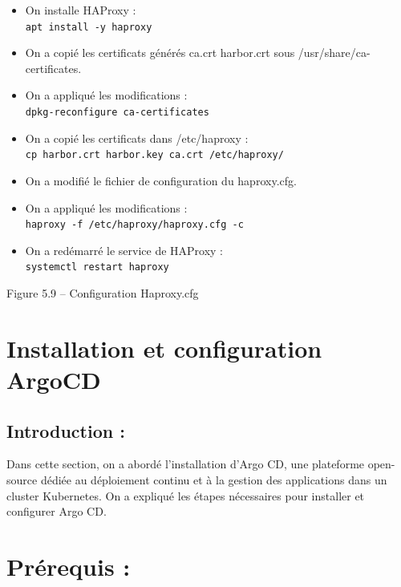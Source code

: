 \begin{itemize}

\item On installe HAProxy : \\
\texttt{apt install -y haproxy}

\item On a copié les certificats générés ca.crt harbor.crt sous /usr/share/ca-certificates.

\item On a appliqué les modifications : \\
\texttt{dpkg-reconfigure ca-certificates}

\item On a copié les certificats dans /etc/haproxy : \\
\texttt{cp harbor.crt harbor.key ca.crt /etc/haproxy/}

\item On a modifié le fichier de configuration du haproxy.cfg.

\item On a appliqué les modifications : \\
\texttt{haproxy -f /etc/haproxy/haproxy.cfg -c}

\item On a redémarré le service de HAProxy : \\
\texttt{systemctl restart haproxy}

\end{itemize}

\begin{center}
Figure 5.9 – Configuration Haproxy.cfg
\end{center}

\section*{Installation et configuration ArgoCD}

\subsection*{Introduction :}

Dans cette section, on a abordé l’installation d’Argo CD, une plateforme open-source dédiée au déploiement continu et à la gestion des applications dans un cluster Kubernetes. On a expliqué les étapes nécessaires pour installer et configurer Argo CD.
\section*{Prérequis :}

